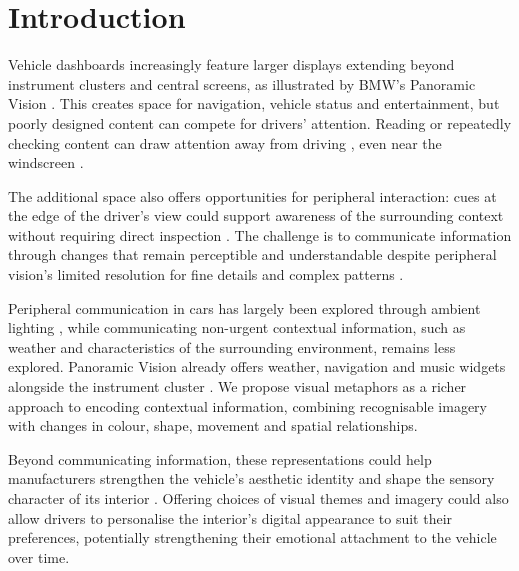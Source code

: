 \documentclass[
english,                 %
bibtex,                  %
includeExtraAbstracts, %
]{kththesis}
\numberwithin{listing}{chapter}
\begin{document}
\glsaddall[types=\acronymtype]
\begingroup
{}
\printnoidxglossary[type=\acronymtype,title={List of Acronyms and Abbreviations}]
\endgroup
\clearpage

\tableofcontents
\markboth{\contentsname}{}
\clearpage

\label{pg:lastPageofPreface}
\let\cleardoublepage\clearpage
\mainmatter
\glsresetall
{}

\chapter{Introduction}
\label{ch:introduction}

Vehicle dashboards increasingly feature larger displays extending beyond instrument clusters and central screens, as illustrated by BMW's Panoramic Vision \cite{BMWPanoramicIDrive2025}. This creates space for navigation, vehicle status and entertainment, but poorly designed content can compete for drivers' attention. Reading or repeatedly checking content can draw attention away from driving \cite{lambleDetectionThresholdsCar1999}, even near the windscreen \cite{hauslschmidAugmentingDriversView2015}.

The additional space also offers opportunities for peripheral interaction: cues at the edge of the driver's view could support awareness of the surrounding context without requiring direct inspection \cite{huangCharacteristicsDriverPeripheral2025}. The challenge is to communicate information through changes that remain perceptible and understandable despite peripheral vision's limited resolution for fine details and complex patterns \cite{strasburgerPeripheralVisionPattern2011}.

Peripheral communication in cars has largely been explored through ambient lighting \cite{lockenEnlighteningDriversSurvey2016}, while communicating non-urgent contextual information, such as weather and characteristics of the surrounding environment, remains less explored. Panoramic Vision already offers weather, navigation and music widgets alongside the instrument cluster \cite{BMWPanoramicIDrive2025}. We propose visual metaphors as a richer approach to encoding contextual information, combining recognisable imagery with changes in colour, shape, movement and spatial relationships.

Beyond communicating information, these representations could help manufacturers strengthen the vehicle's aesthetic identity and shape the sensory character of its interior \cite{tractinsky2011slow,loehmannHeartbeatExperiencePulse2014}. Offering choices of visual themes and imagery could also allow drivers to personalise the interior's digital appearance to suit their preferences, potentially strengthening their emotional attachment to the vehicle over time.
\end{document}
